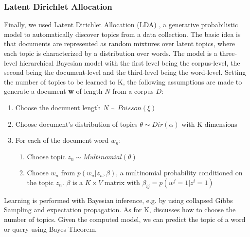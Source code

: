 \documentclass[a4paper]{article}
\begin{document}
\subsubsection{Latent Dirichlet Allocation}
Finally, we used Latent Dirichlet Allocation (LDA) \cite{blei2003latent}, a generative probabilistic model to automatically discover topics from a data collection.
The basic idea is that documents are represented as random mixtures over latent topics, where each topic is characterized by a distribution over words. The model is a three-level hierarchical Bayesian model with the first level being the corpus-level, the second being the document-level and the third-level being the word-level. Setting the number of topics to be learned to K, the following assumptions are made to generate a document \textbf{w} of length $N$ from a corpus $D$:
\begin{enumerate}
\item Choose the document length $N \sim Poisson(\xi)$
\item Choose document's distribution of topics $\theta \sim Dir(\alpha)$ with K dimensions
\item For each of the document word $w_n$:
\begin{enumerate}
\item Choose topic $z_n \sim Multinomial(\theta) $
\item Choose $ w_n$ from $p(w_n|z_n, \beta)$, a multinomial probability conditioned on the topic $z_n$. $\beta$ is a $K \times V$ matrix with $\beta_{ij}=p(w^j=1|z^i=1)$
\end{enumerate}
\end{enumerate}
Learning is performed with Bayesian inference, e.g. by using collapsed Gibbs Sampling and expectation propagation. As for K, \cite{hoffman2010online} discusses how to choose the number of topics.
Given the computed model, we can predict the topic of a word or query using Bayes Theorem.
\end{document}
